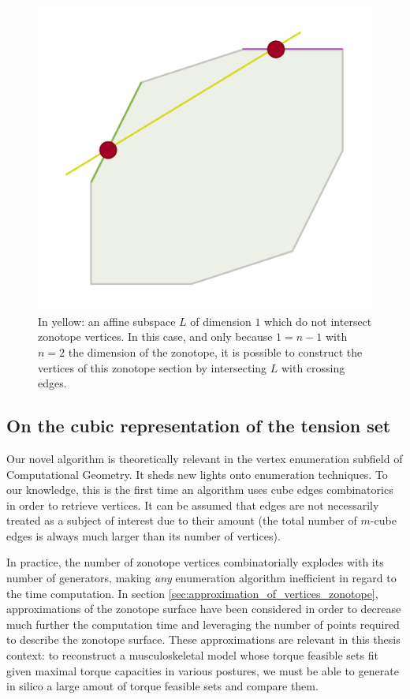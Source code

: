 \begin{figure}[!htb]
    \captionsetup{justification=centering}
    \centering
    \includegraphics[trim={0 0 0 0},clip, width=0.4\linewidth]{img/chapter_2/polytope_section_zono.pdf}
    \caption{In yellow: an affine subspace $L$ of dimension $1$ which do not intersect zonotope vertices. In this case, and only because $1 = n-1$ with $n=2$ the dimension of the zonotope, it is possible to construct the vertices of this zonotope section by intersecting $L$ with crossing edges.}
    \label{fig:zonotope_section_2D_example}
\end{figure}


\subsection{On the cubic representation of the tension set}

Our novel algorithm is theoretically relevant in the vertex enumeration subfield of Computational Geometry. It sheds new lights onto enumeration techniques. To our knowledge, this is the first time an algorithm uses cube edges combinatorics in order to retrieve vertices. It can be assumed that edges are not necessarily treated as a subject of interest due to their amount (the total number of $m$-cube edges is always much larger than its number of vertices).

In practice, the number of zonotope vertices combinatorially explodes with its number of generators, making \emph{any} enumeration algorithm inefficient in regard to the time computation. In section \ref{sec:approximation_of_vertices_zonotope}, approximations of the zonotope surface have been considered in order to decrease much further the computation time and leveraging the number of points required to describe the zonotope surface. These approximations are relevant in this thesis context: to reconstruct a musculoskeletal model whose torque feasible sets fit given maximal torque capacities in various postures, we must be able to generate in silico a large amout of torque feasible sets and compare them.

